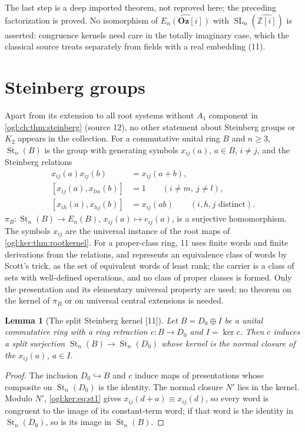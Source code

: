 \documentclass[11pt,oneside]{article}
\numberwithin{equation}{section}
\newtheorem{lemma}[lemma]{Lemma}
\theoremstyle{definition}
\theoremstyle{remark}
\newcommand{\GOz}{\mathbf{Oz}[i]}
\newcommand{\Z}{\mathbb Z}
\newcommand{\SL}{\operatorname{SL}}
\newcommand{\St}{\operatorname{St}}
\newcommand{\src}[1]{\textup{\textsf{\small[#1]}}}
\begin{document}
The last step is a deep imported theorem, not reproved here; the preceding
factorization is proved. No isomorphism of $\widehat{E_n(\GOz)}$ with
$\SL_n(\widehat{\Z[i]})$ is asserted: congruence kernels need care in the
totally imaginary case, which the classical source treats separately from
fields with a real embedding (11).

\section{Steinberg groups}\label{ogl:ker:sec:steinberg}

Apart from its extension to all root systems without $A_1$ component in
\cref{ogl:ch:thm:steinberg} (source 12), no other statement about Steinberg
groups or $K_2$ appears in the collection.
For a commutative unital ring $B$ and $n\ge3$, $\St_n(B)$ is the group with
generating symbols $x_{ij}(a)$, $a\in B$, $i\ne j$, and the Steinberg relations
\begin{align}
 x_{ij}(a)x_{ij}(b)&=x_{ij}(a+b),\label{ogl:ker:eq:st1}\\
 [x_{ij}(a),x_{lm}(b)]&=1\qquad(i\ne m,\ j\ne l),\label{ogl:ker:eq:st2}\\
 [x_{ih}(a),x_{hj}(b)]&=x_{ij}(ab)\qquad(i,h,j\text{ distinct}).\label{ogl:ker:eq:st3}
\end{align}
$\pi_B:\St_n(B)\to E_n(B)$, $x_{ij}(a)\mapsto e_{ij}(a)$, is a surjective
homomorphism. The symbols $x_{ij}$ are the universal instance of the root maps
of \cref{ogl:ker:thm:rootkernel}. For a proper-class ring, 11 uses finite words
and finite derivations from the relations, and represents an equivalence class
of words by Scott's trick, as the set of equivalent words of least rank; the
carrier is a class of sets with well-defined operations, and no class of proper
classes is formed. Only the presentation and its elementary universal property
are used; no theorem on the kernel of $\pi_B$ or on universal central
extensions is needed.

\begin{lemma}[The split Steinberg kernel \src{11}]\label{ogl:ker:lem:stkernel}
Let $B=D_0\oplus I$ be a unital commutative ring with a ring retraction
$c:B\to D_0$ and $I=\ker c$. Then $c$ induces a split surjection
$\St_n(B)\to\St_n(D_0)$ whose kernel is the normal closure of the $x_{ij}(a)$,
$a\in I$.
\end{lemma}
\begin{proof}
The inclusion $D_0\hookrightarrow B$ and $c$ induce maps of presentations whose
composite on $\St_n(D_0)$ is the identity. The normal closure $N'$ lies in the
kernel. Modulo $N'$, \eqref{ogl:ker:eq:st1} gives $x_{ij}(d+a)\equiv x_{ij}(d)$,
so every word is congruent to the image of its constant-term word; if that word
is the identity in $\St_n(D_0)$, so is its image in $\St_n(B)$.
\end{proof}
\end{document}

